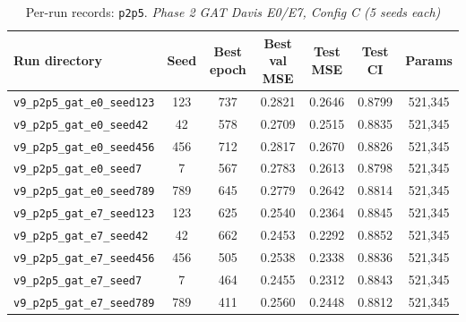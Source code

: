 \begin{table}[!h]
\centering\scriptsize
\caption{Per-run records: \texttt{p2p5}. \textit{Phase 2 GAT Davis E0/E7, Config C (5 seeds each)}}
\label{tab:v9_runs_p2p5}
\begin{tabular}{p{4.8cm}cccccc}
\toprule
Run directory & Seed & Best epoch & Best val MSE & Test MSE & Test CI & Params \\
\midrule
\texttt{v9\_\allowbreak{}p2p5\_\allowbreak{}gat\_\allowbreak{}e0\_\allowbreak{}seed123} & 123 & 737 & 0.2821 & 0.2646 & 0.8799 & 521,345 \\
\texttt{v9\_\allowbreak{}p2p5\_\allowbreak{}gat\_\allowbreak{}e0\_\allowbreak{}seed42} & 42 & 578 & 0.2709 & 0.2515 & 0.8835 & 521,345 \\
\texttt{v9\_\allowbreak{}p2p5\_\allowbreak{}gat\_\allowbreak{}e0\_\allowbreak{}seed456} & 456 & 712 & 0.2817 & 0.2670 & 0.8826 & 521,345 \\
\texttt{v9\_\allowbreak{}p2p5\_\allowbreak{}gat\_\allowbreak{}e0\_\allowbreak{}seed7} & 7 & 567 & 0.2783 & 0.2613 & 0.8798 & 521,345 \\
\texttt{v9\_\allowbreak{}p2p5\_\allowbreak{}gat\_\allowbreak{}e0\_\allowbreak{}seed789} & 789 & 645 & 0.2779 & 0.2642 & 0.8814 & 521,345 \\
\texttt{v9\_\allowbreak{}p2p5\_\allowbreak{}gat\_\allowbreak{}e7\_\allowbreak{}seed123} & 123 & 625 & 0.2540 & 0.2364 & 0.8845 & 521,345 \\
\texttt{v9\_\allowbreak{}p2p5\_\allowbreak{}gat\_\allowbreak{}e7\_\allowbreak{}seed42} & 42 & 662 & 0.2453 & 0.2292 & 0.8852 & 521,345 \\
\texttt{v9\_\allowbreak{}p2p5\_\allowbreak{}gat\_\allowbreak{}e7\_\allowbreak{}seed456} & 456 & 505 & 0.2538 & 0.2338 & 0.8836 & 521,345 \\
\texttt{v9\_\allowbreak{}p2p5\_\allowbreak{}gat\_\allowbreak{}e7\_\allowbreak{}seed7} & 7 & 464 & 0.2455 & 0.2312 & 0.8843 & 521,345 \\
\texttt{v9\_\allowbreak{}p2p5\_\allowbreak{}gat\_\allowbreak{}e7\_\allowbreak{}seed789} & 789 & 411 & 0.2560 & 0.2448 & 0.8812 & 521,345 \\
\bottomrule
\end{tabular}
\end{table}

